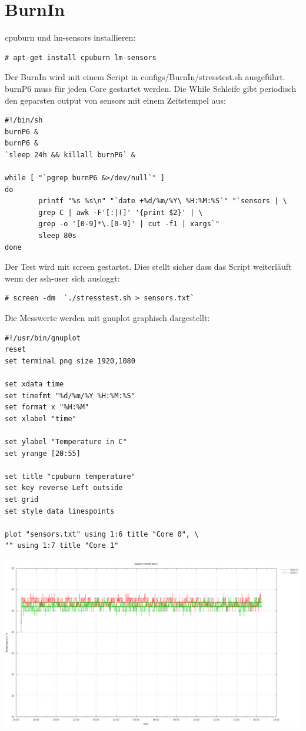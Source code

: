 \section{BurnIn}
cpuburn und lm-sensors installieren:
\begin{lstlisting}[style=Bash]
# apt-get install cpuburn lm-sensors
\end{lstlisting}
Der BurnIn wird mit einem Script in configs/BurnIn/stresstest.sh ausgeführt.\\
burnP6 muss für jeden Core gestartet werden. Die While Schleife gibt periodisch den geparsten output von sensors mit einem Zeitstempel aus:
\begin{lstlisting}[style=Bash]
#!/bin/sh
burnP6 &
burnP6 &
`sleep 24h && killall burnP6` &

while [ "`pgrep burnP6 &>/dev/null`" ]
do
        printf "%s %s\n" "`date +%d/%m/%Y\ %H:%M:%S`" "`sensors | \
		grep C | awk -F'[:|(]' '{print $2}' | \
		grep -o '[0-9]*\.[0-9]' | cut -f1 | xargs`"
        sleep 80s
done
\end{lstlisting}
Der Test wird mit screen gestartet. Dies stellt sicher dass das Script weiterläuft wenn der ssh-user sich ausloggt:
\begin{lstlisting}[style=Bash]
# screen -dm  `./stresstest.sh > sensors.txt`
\end{lstlisting}
Die Messwerte werden mit gnuplot graphisch dargestellt:
\begin{lstlisting}[style=Bash]
#!/usr/bin/gnuplot
reset
set terminal png size 1920,1080

set xdata time
set timefmt "%d/%m/%Y %H:%M:%S"
set format x "%H:%M"
set xlabel "time"

set ylabel "Temperature in C"
set yrange [20:55]

set title "cpuburn temperature"
set key reverse Left outside
set grid
set style data linespoints

plot "sensors.txt" using 1:6 title "Core 0", \
"" using 1:7 title "Core 1"
\end{lstlisting}
\includegraphics[width=\textwidth,height=\textheight,keepaspectratio]{../aufgabe1/BurnIn/plot.png}
